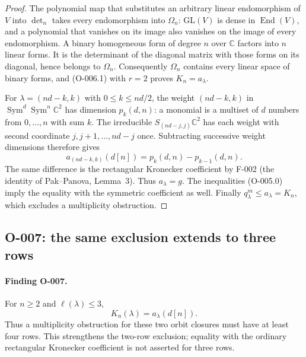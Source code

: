 \begin{proof}
The polynomial map that substitutes an arbitrary linear endomorphism
of $V$ into $\det_n$ takes every endomorphism into $\Omega_n$:
$\mathrm{GL}(V)$ is dense in $\operatorname{End}(V)$, and a polynomial
that vanishes on its image also vanishes on the image of every
endomorphism. A binary homogeneous form of degree $n$ over
$\mathbb C$ factors into $n$ linear forms. It is the determinant of
the diagonal matrix with those forms on its diagonal, hence belongs
to $\Omega_n$. Consequently $\Omega_n$ contains every linear space
of binary forms, and (O-006.1) with $r=2$ proves $K_n=a_\lambda$.

For $\lambda=(nd-k,k)$ with $0\leq k\leq nd/2$, the weight
$(nd-k,k)$ in $\operatorname{Sym}^d\operatorname{Sym}^n\mathbb C^2$
has dimension $p_k(d,n)$: a monomial is a multiset of $d$ numbers
from $0,\ldots,n$ with sum $k$. The irreducible
$S_{(nd-j,j)}\mathbb C^2$ has each weight with second coordinate
$j,j+1,\ldots,nd-j$ once. Subtracting successive weight dimensions
therefore gives
\[
                  a_{(nd-k,k)}(d[n])=p_k(d,n)-p_{k-1}(d,n).
\]
The same difference is the rectangular Kronecker coefficient by
F-002 (the identity of Pak--Panova, Lemma~3). Thus $a_\lambda=g$.
The inequalities (O-005.0) imply the equality with the symmetric
coefficient as well. Finally $q^m_\lambda\leq a_\lambda=K_n$,
which excludes a multiplicity obstruction.
\end{proof}

\subsection{O-007: the same exclusion extends to three rows}

\paragraph{Finding O-007.}
For $n\geq2$ and $\ell(\lambda)\leq3$,
\[
                         K_n(\lambda)=a_\lambda(d[n]).   \tag{O-007.1}
\]
Thus a multiplicity obstruction for these two orbit closures must have
at least four rows. This strengthens the two-row exclusion; equality
with the ordinary rectangular Kronecker coefficient is not asserted
for three rows.

